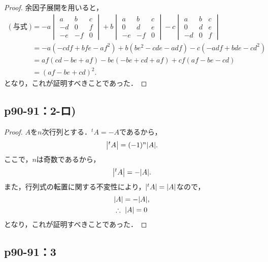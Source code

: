 \documentclass[uplatex,dvipdfmx,a4paper,11pt,fleqn]{jsarticle}
\begin{document}
\begin{tleftbar}
    \begin{proof}
    余因子展開を用いると，
    \begin{align*}
            (\text{与式}) & = -a \begin{vmatrix} a & b & c \\ -d & 0 &f \\ -e & -f & 0 \end{vmatrix} +b \begin{vmatrix} a & b & c \\ 0 & d & e \\ -e & -f & 0 \end{vmatrix} -c \begin{vmatrix} a & b & c \\ 0 & d & e \\ -d & 0 & f \end{vmatrix} \\
            & = -a (-cdf +bfe-af^2)+b(be^2-cde-adf)-c(-adf+bde-cd^2) \\
            & = af (cd-be+af) -be(-be+cd+af) +cf(af-be-cd) \\
            & = (af-be+cd)^2.
        \end{align*}
        となり，これが証明すべきことであった．
    \end{proof}
    \end{tleftbar}


\subsection*{p90-91：2-ロ)}

\begin{tleftbar}
    \begin{proof}
    $A$を$n$次行列とする．${}^t A = -A$であるから，
    \[
        \abs{{}^t A}=(-1)^n\abs{A}.
    \]
    ここで，$n$は奇数であるから，
    \[
        \abs{{}^t A}=-\abs{A}.
    \]
    また，行列式の転置に関する不変性により，$\abs{{}^t A}=\abs{A}$なので，
    \begin{align*} 
        & \abs{A}=-\abs{A} , \\
        & \therefore ~ \abs{A}=0
    \end{align*}
    となり，これが証明すべきことであった．
\end{proof}
\end{tleftbar}

\newpage 
\subsection*{p90-91：3}
\end{document}
